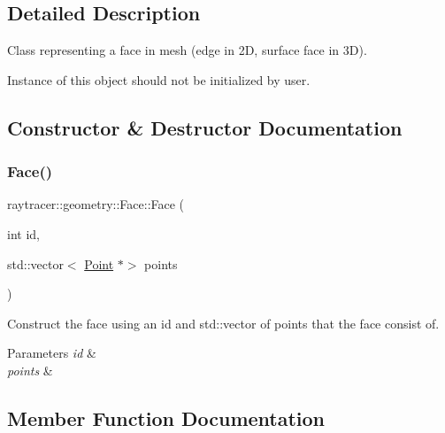 \subsection{Detailed Description}
Class representing a face in mesh (edge in 2D, surface face in 3D). 

Instance of this object should not be initialized by user. 

\subsection{Constructor \& Destructor Documentation}
\mbox{\label{classraytracer_1_1geometry_1_1Face_ae6c1cac1c9f495b11dfa26cfec783fce}} 
\subsubsection{\texorpdfstring{Face()}{Face()}}
{\footnotesize\ttfamily raytracer\+::geometry\+::\+Face\+::\+Face (\begin{DoxyParamCaption}\item[{int}]{id,  }\item[{std\+::vector$<$ \hyperlink{classraytracer_1_1geometry_1_1Point}{Point} $\ast$$>$}]{points }\end{DoxyParamCaption})\hspace{0.3cm}{\ttfamily [explicit]}}



Construct the face using an id and std\+::vector of points that the face consist of. 


\begin{DoxyParams}{Parameters}
{\em id} & \\
\hline
{\em points} & \\
\hline
\end{DoxyParams}


\subsection{Member Function Documentation}
\mbox{\label{classraytracer_1_1geometry_1_1Face_a83092455149193cca0cfb4e72809e6cf}} 
